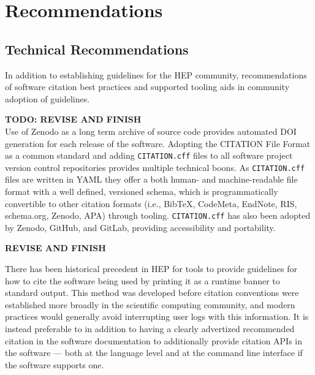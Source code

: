 \section{Recommendations}\label{sec:recommendations}

\subsection{Technical Recommendations}\label{sec:recommendations_technical}

In addition to establishing guidelines for the HEP community, recommendations of software citation best practices and supported tooling aids in community adoption of guidelines.

\textbf{TODO: REVISE AND FINISH}\\
Use of Zenodo as a long term archive of source code provides automated DOI generation for each release of the software.
Adopting the CITATION File Format as a common standard and adding \texttt{CITATION.cff} files to all software project version control repositories provides multiple technical boons.
As \texttt{CITATION.cff} files are written in YAML they offer a both human- and machine-readable file format with a well defined, versioned schema, which is programmatically convertible to other citation formats (i.e., BibTeX, CodeMeta, EndNote, RIS, schema.org, Zenodo, APA) through tooling.
\texttt{CITATION.cff} has also been adopted by Zenodo, GitHub, and GitLab, providing accessibility and portability.

\textbf{REVISE AND FINISH}

There has been historical precedent in HEP for tools to provide guidelines for how to cite the software being used by printing it as a runtime banner to standard output.
This method was developed before citation conventions were established more broadly in the scientific computing community, and modern practices would generally avoid interrupting user logs with this information.
It is instead preferable to in addition to having a clearly advertized recommended citation in the software documentation to additionally provide citation APIs in the software --- both at the language level and at the command line interface if the software supports one.
